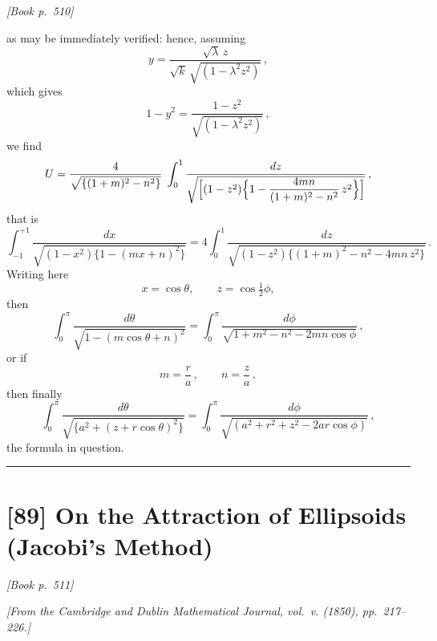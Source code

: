 \documentclass[11pt]{article}
\begin{document}
\medskip
\noindent\textit{[Book p.~510]}\hfill

\smallskip

\noindent as may be immediately verified: hence, assuming
\[
y = \frac{\sqrt{\lambda}\, z}{\sqrt{k}\,\sqrt{(1 - \lambda^{2} z^{2})}}\,,
\]
which gives
\[
1 - y^{2} = \frac{1 - z^{2}}{\sqrt{(1 - \lambda^{2} z^{2})}}\,,
\]
we find
\[
U = \frac{4}{\sqrt{\{(1 + m)^{2} - n^{2}\}}}\;\int_{0}^{1} \frac{dz}{\sqrt{\Bigl[(1 - z^{2})\Bigl\{1 - \dfrac{4 m n}{(1 + m)^{2} - n^{2}}\, z^{2}\Bigr\}\Bigr]}}\,,
\]
that is
\[
\int_{-1}^{+1} \frac{dx}{\sqrt{(1 - x^{2})\{1 - (m x + n)^{2}\}}} = 4 \int_{0}^{1} \frac{dz}{\sqrt{(1 - z^{2})\{(1 + m)^{2} - n^{2} - 4 m n\, z^{2}\}}}\,.
\]
Writing here
\[
x = \cos\theta,\qquad z = \cos\tfrac{1}{2}\phi,
\]
then
\[
\int_{0}^{\pi} \frac{d\theta}{\sqrt{1 - (m\cos\theta + n)^{2}}} = \int_{0}^{\pi} \frac{d\phi}{\sqrt{1 + m^{2} - n^{2} - 2 m n \cos\phi}}\,,
\]
or if
\[
m = \frac{r}{a}\,,\qquad n = \frac{z}{a}\,,
\]
then finally
\[
\int_{0}^{\pi} \frac{d\theta}{\sqrt{\{a^{2} + (z + r\cos\theta)^{2}\}}} = \int_{0}^{\pi} \frac{d\phi}{\sqrt{(a^{2} + r^{2} + z^{2} - 2 a r \cos\phi)}}\,,
\]
the formula in question.

\bigskip
\hrule
\bigskip


\section*{[89] On the Attraction of Ellipsoids (Jacobi's Method)}

\noindent\textit{[Book p.~511]}\hfill

\smallskip

\noindent\emph{[From the Cambridge and Dublin Mathematical Journal, vol.~v. (1850), pp.~217--226.]}

\medskip
\end{document}
